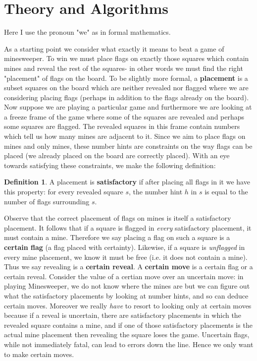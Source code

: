 \documentclass{article}
\theoremstyle{definition}
\newtheorem{definition}{Definition}
\theoremstyle{definition}
\theoremstyle{theorem}
\begin{document}
	\section*{Theory and Algorithms}
	Here I use the pronoun "we" as in formal mathematics.
	
	As a starting point we consider what exactly it means to beat a game of minesweeper. To win we must place flags on exactly those squares which contain mines and reveal the rest of the squares- in other words we must find the right "placement" of flags on the board. To be slightly more formal, a \textbf{placement} is a subset squares on the board which are neither revealed nor flagged where we are considering placing flags (perhaps in addition to the flags already on the board). Now suppose we are playing a particular game and furthermore we are looking at a freeze frame of the game where some of the squares are revealed and perhaps some squares are flagged. The revealed squares in this frame contain numbers which tell us how many mines are adjacent to it. Since we aim to place flags on mines and only mines, these number hints are constraints on the way flags can be placed (we already placed on the board are correctly placed). With an eye towards satisfying these constraints, we make the following definition:
	\begin{definition}
		A placement is \textbf{satisfactory} if after placing all flags in it we have this property: for every revealed square $s$, the number hint $h$ in $s$ is equal to the number of flags surrounding $s$.
	\end{definition}
	Observe that the correct placement of flags on mines is itself a satisfactory placement. It follows that if a square is flagged in \textit{every} satisfactory placement, it must contain a mine. Therefore we say placing a flag on such a square is a \textbf{certain flag} (a flag placed with certainty). Likewise, if a square is \textit{unflagged} in every mine placement, we know it must be free (i.e. it does not contain a mine). Thus we say revealing is a \textbf{certain reveal}. A \textbf{certain move} is a certain flag or a certain reveal. Consider the value of a certian move over an uncertain move: in playing Minesweeper, we do not know where the mines are but we can figure out what the satisfactory placements by looking at number hints, and so can deduce certain moves. Moreover we really \textit{have} to resort to looking only at certain moves because if a reveal is uncertain, there are satisfactory placements in which the revealed square contains a mine, and if one of those satisfactory placements is the actual mine placement then revealing the square loses the game. Uncertain flags, while not immediately fatal, can lead to errors down the line. Hence we only want to make certain moves. 
	
\end{document}
